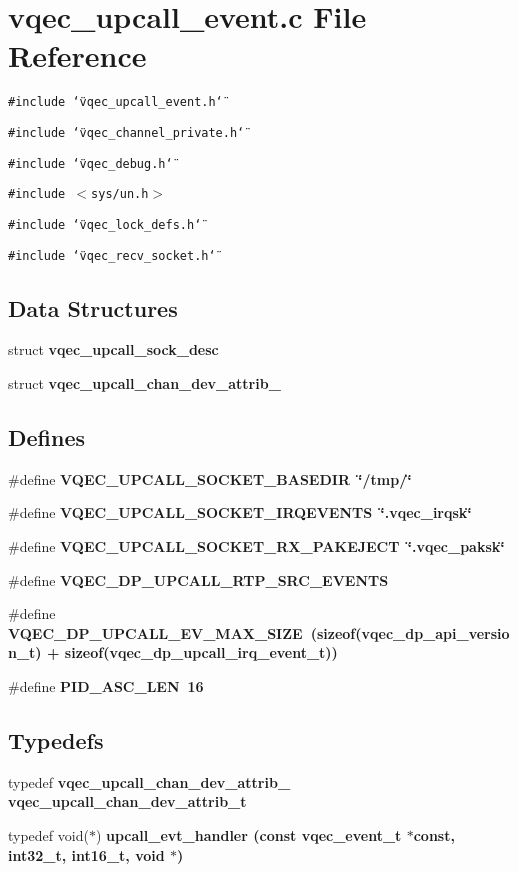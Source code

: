 \section{vqec\_\-upcall\_\-event.c File Reference}
\label{vqec__upcall__event_8c}
{\tt \#include \char`\"{}vqec\_\-upcall\_\-event.h\char`\"{}}\par
{\tt \#include \char`\"{}vqec\_\-channel\_\-private.h\char`\"{}}\par
{\tt \#include \char`\"{}vqec\_\-debug.h\char`\"{}}\par
{\tt \#include $<$sys/un.h$>$}\par
{\tt \#include \char`\"{}vqec\_\-lock\_\-defs.h\char`\"{}}\par
{\tt \#include \char`\"{}vqec\_\-recv\_\-socket.h\char`\"{}}\par
\subsection*{Data Structures}
\begin{CompactItemize}
\item 
struct \bf{vqec\_\-upcall\_\-sock\_\-desc}
\item 
struct \bf{vqec\_\-upcall\_\-chan\_\-dev\_\-attrib\_\-}
\end{CompactItemize}
\subsection*{Defines}
\begin{CompactItemize}
\item 
\#define \bf{VQEC\_\-UPCALL\_\-SOCKET\_\-BASEDIR}~\char`\"{}/tmp/\char`\"{}
\item 
\#define \bf{VQEC\_\-UPCALL\_\-SOCKET\_\-IRQEVENTS}~\char`\"{}.vqec\_\-irqsk\char`\"{}
\item 
\#define \bf{VQEC\_\-UPCALL\_\-SOCKET\_\-RX\_\-PAKEJECT}~\char`\"{}.vqec\_\-paksk\char`\"{}
\item 
\#define \bf{VQEC\_\-DP\_\-UPCALL\_\-RTP\_\-SRC\_\-EVENTS}
\item 
\#define \bf{VQEC\_\-DP\_\-UPCALL\_\-EV\_\-MAX\_\-SIZE}~(sizeof(vqec\_\-dp\_\-api\_\-version\_\-t) + sizeof(vqec\_\-dp\_\-upcall\_\-irq\_\-event\_\-t))
\item 
\#define \bf{PID\_\-ASC\_\-LEN}~16
\end{CompactItemize}
\subsection*{Typedefs}
\begin{CompactItemize}
\item 
typedef \bf{vqec\_\-upcall\_\-chan\_\-dev\_\-attrib\_\-} \bf{vqec\_\-upcall\_\-chan\_\-dev\_\-attrib\_\-t}
\item 
typedef void($\ast$) \bf{upcall\_\-evt\_\-handler} (const vqec\_\-event\_\-t $\ast$const, int32\_\-t, int16\_\-t, void $\ast$)
\end{CompactItemize}
